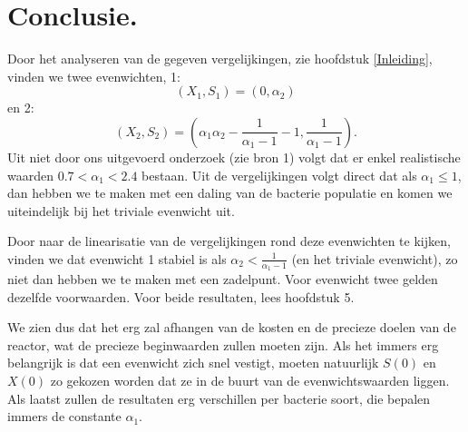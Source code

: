 
\chapter{Conclusie.}
Door het analyseren van de gegeven vergelijkingen, zie hoofdstuk \ref{Inleiding}, vinden we twee evenwichten, 1:
\[ 
	 (X_1, S_1) = (0, \alpha_2)
\]
en 2:
\[
	(X_2, S_2) =\left( \alpha_1\alpha_2 - \frac{1}{\alpha_1 - 1} - 1, \frac{1}{\alpha_1 - 1}\right).
\] 
Uit niet door ons uitgevoerd onderzoek (zie bron 1) volgt dat er enkel realistische waarden $0.7 < \alpha_1 < 2.4$ bestaan. Uit de vergelijkingen volgt direct dat als $\alpha_1 \leq 1$, dan hebben we te maken met een daling van de bacterie populatie en komen we uiteindelijk bij het triviale evenwicht uit. 

Door naar de linearisatie van de vergelijkingen rond deze evenwichten te kijken, vinden we dat evenwicht 1 stabiel is als $\alpha_2 < \frac{1}{\alpha_1 - 1}$ (en het triviale evenwicht), zo niet dan hebben we te maken met een zadelpunt. Voor evenwicht twee gelden dezelfde voorwaarden. Voor beide resultaten, lees hoofdstuk 5. 

We zien dus dat het erg zal afhangen van de kosten en de precieze doelen van de reactor, wat de precieze beginwaarden zullen moeten zijn. Als het immers erg belangrijk is dat een evenwicht zich snel vestigt, moeten natuurlijk $S(0)$ en $X(0)$ zo gekozen worden dat ze in de buurt van de evenwichtswaarden liggen. Als laatst zullen de resultaten erg verschillen per bacterie soort, die bepalen immers de constante $\alpha_1$. 

